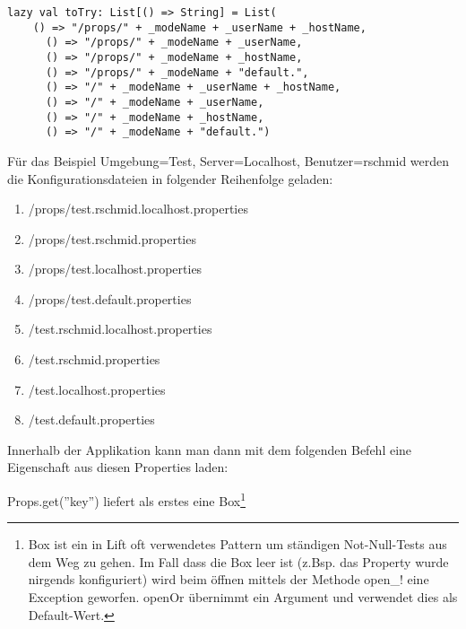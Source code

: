 \begin{lstlisting}[caption=Konfigurationsschema von .properties-Dateien im Lift Framework]
lazy val toTry: List[() => String] = List(
    () => "/props/" + _modeName + _userName + _hostName,
      () => "/props/" + _modeName + _userName,
      () => "/props/" + _modeName + _hostName,
      () => "/props/" + _modeName + "default.",
      () => "/" + _modeName + _userName + _hostName,
      () => "/" + _modeName + _userName,
      () => "/" + _modeName + _hostName,
      () => "/" + _modeName + "default.")
\end{lstlisting}

F\"ur das Beispiel Umgebung=Test, Server=Localhost, Benutzer=rschmid werden die Konfigurationsdateien in folgender Reihenfolge geladen:

\begin{enumerate}
\item /props/test.rschmid.localhost.properties
\item /props/test.rschmid.properties
\item /props/test.localhost.properties
\item /props/test.default.properties
\item /test.rschmid.localhost.properties
\item /test.rschmid.properties
\item /test.localhost.properties
\item /test.default.properties
\end{enumerate}

Innerhalb der Applikation kann man dann mit dem folgenden Befehl eine Eigenschaft aus diesen Properties laden:

Props.get(''key'') liefert als erstes eine Box\footnote{Box ist ein in Lift oft verwendetes Pattern um st\"andigen Not-Null-Tests aus dem Weg zu gehen. Im Fall dass die Box leer ist  (z.Bsp. das Property wurde nirgends konfiguriert) wird beim \"offnen mittels der Methode open\_! eine Exception geworfen. openOr \"ubernimmt ein Argument und verwendet dies als Default-Wert.}

